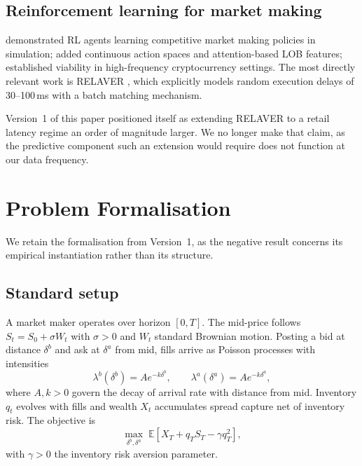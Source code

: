 \documentclass[11pt]{article}
\begin{document}
\subsection{Reinforcement learning for market making}

\citet{spooner2018} demonstrated RL agents learning competitive market making
policies in simulation; \citet{guo2023} added continuous action spaces and
attention-based LOB features; \citet{briola2021} established viability in
high-frequency cryptocurrency settings. The most directly relevant work is
RELAVER \citep{jiang2025}, which explicitly models random execution delays of
30--100\,ms with a batch matching mechanism.

Version~1 of this paper positioned itself as extending RELAVER to a retail
latency regime an order of magnitude larger. We no longer make that claim, as
the predictive component such an extension would require does not function at
our data frequency.

\section{Problem Formalisation}
\label{sec:formal}

We retain the formalisation from Version~1, as the negative result concerns its
empirical instantiation rather than its structure.

\subsection{Standard setup}

A market maker operates over horizon $[0,T]$. The mid-price follows
$S_t = S_0 + \sigma W_t$ with $\sigma > 0$ and $W_t$ standard Brownian motion.
Posting a bid at distance $\delta^b$ and ask at $\delta^a$ from mid, fills
arrive as Poisson processes with intensities
\begin{equation}
\lambda^b(\delta^b) = A e^{-k\delta^b}, \qquad
\lambda^a(\delta^a) = A e^{-k\delta^a},
\end{equation}
where $A, k > 0$ govern the decay of arrival rate with distance from mid.
Inventory $q_t$ evolves with fills and wealth $X_t$ accumulates spread capture
net of inventory risk. The objective is
\begin{equation}
\max_{\delta^b,\delta^a} \; \mathbb{E}\!\left[ X_T + q_T S_T - \gamma q_T^2 \right],
\end{equation}
with $\gamma > 0$ the inventory risk aversion parameter.
\end{document}
